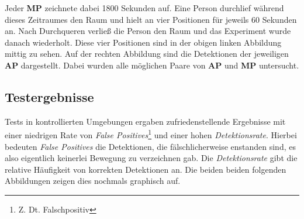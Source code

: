 Jeder \textbf{MP} zeichnete dabei 1800 Sekunden auf. Eine Person durchlief während dieses Zeitraumes den Raum und hielt an vier Positionen für jeweils 60 Sekunden an. Nach Durchqueren verließ die Person den Raum und das Experiment wurde danach wiederholt. Diese vier Positionen sind in der obigen linken Abbildung mittig zu sehen. Auf der rechten Abbildung sind die Detektionen der jeweiligen \textbf{AP} dargestellt. Dabei wurden alle möglichen Paare von \textbf{AP} und \textbf{MP} untersucht.

\subsection{Testergebnisse}
 Tests in kontrollierten Umgebungen ergaben zufriedenstellende Ergebnisse mit einer niedrigen Rate von \textit{False Positives}\footnote{Z. Dt. Falschpositiv} und einer hohen \textit{Detektionsrate}. Hierbei bedeuten \textit{False Positives} die Detektionen, die fälschlicherweise enstanden sind, es also eigentlich keinerlei Bewegung zu verzeichnen gab. Die \textit{Detektionsrate} gibt die relative Häufigkeit von korrekten Detektionen an. Die beiden beiden folgenden Abbildungen zeigen dies nochmals graphisch auf.

